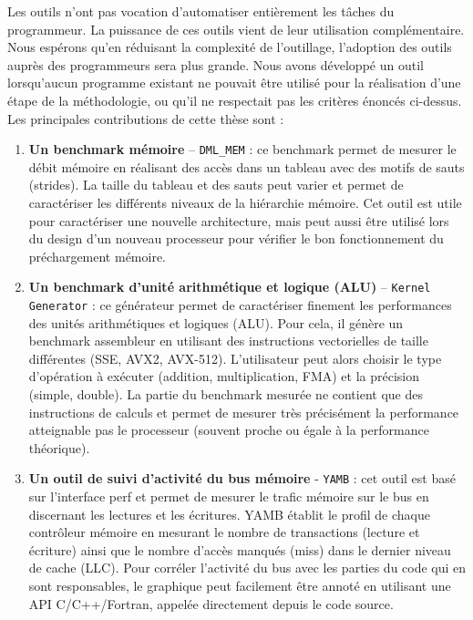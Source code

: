         Les outils n'ont pas vocation d'automatiser entièrement les tâches du programmeur. La puissance de ces outils vient de leur utilisation complémentaire. Nous espérons qu'en réduisant la complexité de l'outillage, l'adoption des outils auprès des programmeurs sera plus grande. Nous avons développé un outil lorsqu'aucun programme existant ne pouvait être utilisé pour la réalisation d'une étape de la méthodologie, ou qu'il ne respectait pas les critères énoncés ci-dessus. Les principales contributions de cette thèse sont :
        \begin{enumerate}

            \item \textbf{Un benchmark mémoire} – \verb=DML_MEM= : ce benchmark permet de mesurer le débit mémoire en réalisant des accès dans un tableau avec des motifs de sauts (strides). La taille du tableau et des sauts peut varier et permet de caractériser les différents niveaux de la hiérarchie mémoire. Cet outil est utile pour caractériser une nouvelle architecture, mais peut aussi être utilisé lors du design d'un nouveau processeur pour vérifier le bon fonctionnement du préchargement mémoire.
            
            \item \textbf{Un benchmark d'unité arithmétique et logique (ALU)} – \verb|Kernel Generator| : ce générateur permet de caractériser finement les performances des unités arithmétiques et logiques (ALU). Pour cela, il génère un benchmark assembleur en utilisant des instructions vectorielles de taille différentes (SSE, AVX2, AVX-512). L'utilisateur peut alors choisir le type d'opération à exécuter (addition, multiplication, FMA) et la précision (simple, double). La partie du benchmark mesurée ne contient que des instructions de calculs et permet de mesurer très précisément la performance atteignable pas le processeur (souvent proche ou égale à la performance théorique).
                        
            \item \textbf{Un outil de suivi d'activité du bus mémoire} -  \verb=YAMB= : cet outil est basé sur l'interface perf et permet de mesurer le trafic mémoire sur le bus en discernant les lectures et les écritures. YAMB établit le profil de chaque contrôleur mémoire en mesurant le nombre de transactions (lecture et écriture) ainsi que le nombre d'accès manqués (miss) dans le dernier niveau de cache (LLC). Pour corréler l'activité du bus avec les parties du code qui en sont responsables, le graphique peut facilement être annoté en utilisant une API C/C++/Fortran, appelée directement depuis le code source.
            

\end{enumerate}
